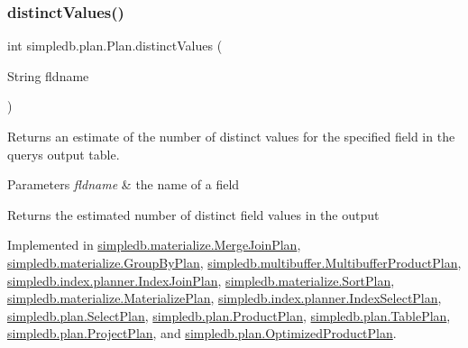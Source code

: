 \subsubsection{\texorpdfstring{distinct\+Values()}{distinctValues()}}
{\footnotesize\ttfamily int simpledb.\+plan.\+Plan.\+distinct\+Values (\begin{DoxyParamCaption}\item[{String}]{fldname }\end{DoxyParamCaption})}

Returns an estimate of the number of distinct values for the specified field in the query\textquotesingle{}s output table. 
\begin{DoxyParams}{Parameters}
{\em fldname} & the name of a field \\
\hline
\end{DoxyParams}
\begin{DoxyReturn}{Returns}
the estimated number of distinct field values in the output 
\end{DoxyReturn}


Implemented in \hyperlink{classsimpledb_1_1materialize_1_1MergeJoinPlan_a70b3e49e98fb23b0f99051e5f3e8af60}{simpledb.\+materialize.\+Merge\+Join\+Plan}, \hyperlink{classsimpledb_1_1materialize_1_1GroupByPlan_ac7d2a7c034341a5c032a1247a297ec1e}{simpledb.\+materialize.\+Group\+By\+Plan}, \hyperlink{classsimpledb_1_1multibuffer_1_1MultibufferProductPlan_a94df401d9ea9f4da99e4851fc5be731a}{simpledb.\+multibuffer.\+Multibuffer\+Product\+Plan}, \hyperlink{classsimpledb_1_1index_1_1planner_1_1IndexJoinPlan_a91f22c04a47d5bc2385eeadd9b270ac5}{simpledb.\+index.\+planner.\+Index\+Join\+Plan}, \hyperlink{classsimpledb_1_1materialize_1_1SortPlan_a7742b83f40664e6a497f87b0e1df958f}{simpledb.\+materialize.\+Sort\+Plan}, \hyperlink{classsimpledb_1_1materialize_1_1MaterializePlan_a98964c2c20961730b37e240e318b537d}{simpledb.\+materialize.\+Materialize\+Plan}, \hyperlink{classsimpledb_1_1index_1_1planner_1_1IndexSelectPlan_a7552fbdecccb53183ce575051cdb93a1}{simpledb.\+index.\+planner.\+Index\+Select\+Plan}, \hyperlink{classsimpledb_1_1plan_1_1SelectPlan_ac7c325819656fe5de7a5b4b88ced3bc7}{simpledb.\+plan.\+Select\+Plan}, \hyperlink{classsimpledb_1_1plan_1_1ProductPlan_af15c3dd2da35b2d41ed02e0586603f39}{simpledb.\+plan.\+Product\+Plan}, \hyperlink{classsimpledb_1_1plan_1_1TablePlan_a07271b00072ebfcc314da8f4be7a93f4}{simpledb.\+plan.\+Table\+Plan}, \hyperlink{classsimpledb_1_1plan_1_1ProjectPlan_a5a6ec7fd1d13d1ae9f14d81f5d61be56}{simpledb.\+plan.\+Project\+Plan}, and \hyperlink{classsimpledb_1_1plan_1_1OptimizedProductPlan_a53c2cbca815961d5349736f735fa2a0b}{simpledb.\+plan.\+Optimized\+Product\+Plan}.

